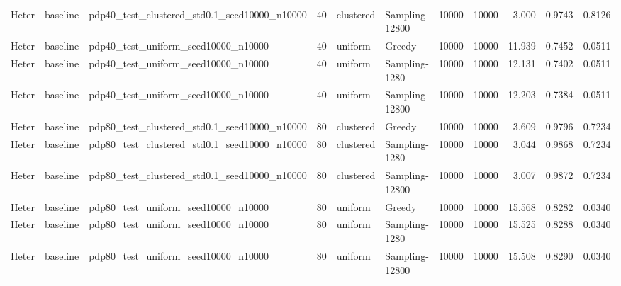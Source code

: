 \begin{tabular}{lllllllrrrr}
Heter & baseline & pdp40_test_clustered_std0.1_seed10000_n10000 & 40 & clustered & Sampling-12800 & 10000 & 10000 & 3.000 & 0.9743 & 0.8126 \\
Heter & baseline & pdp40_test_uniform_seed10000_n10000 & 40 & uniform & Greedy & 10000 & 10000 & 11.939 & 0.7452 & 0.0511 \\
Heter & baseline & pdp40_test_uniform_seed10000_n10000 & 40 & uniform & Sampling-1280 & 10000 & 10000 & 12.131 & 0.7402 & 0.0511 \\
Heter & baseline & pdp40_test_uniform_seed10000_n10000 & 40 & uniform & Sampling-12800 & 10000 & 10000 & 12.203 & 0.7384 & 0.0511 \\
Heter & baseline & pdp80_test_clustered_std0.1_seed10000_n10000 & 80 & clustered & Greedy & 10000 & 10000 & 3.609 & 0.9796 & 0.7234 \\
Heter & baseline & pdp80_test_clustered_std0.1_seed10000_n10000 & 80 & clustered & Sampling-1280 & 10000 & 10000 & 3.044 & 0.9868 & 0.7234 \\
Heter & baseline & pdp80_test_clustered_std0.1_seed10000_n10000 & 80 & clustered & Sampling-12800 & 10000 & 10000 & 3.007 & 0.9872 & 0.7234 \\
Heter & baseline & pdp80_test_uniform_seed10000_n10000 & 80 & uniform & Greedy & 10000 & 10000 & 15.568 & 0.8282 & 0.0340 \\
Heter & baseline & pdp80_test_uniform_seed10000_n10000 & 80 & uniform & Sampling-1280 & 10000 & 10000 & 15.525 & 0.8288 & 0.0340 \\
Heter & baseline & pdp80_test_uniform_seed10000_n10000 & 80 & uniform & Sampling-12800 & 10000 & 10000 & 15.508 & 0.8290 & 0.0340 \\
\bottomrule\end{tabular}
